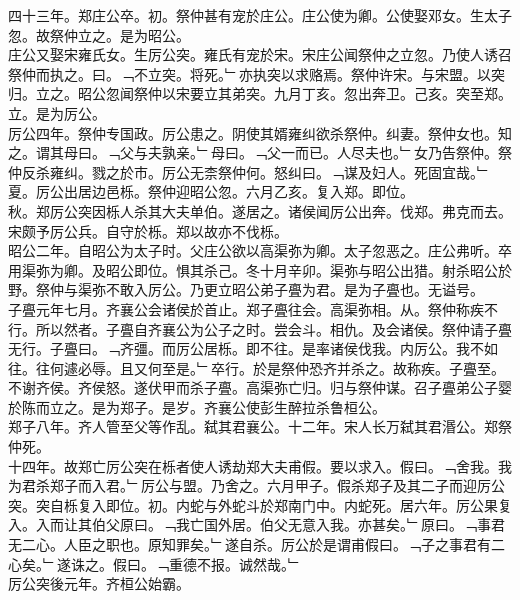 \documentclass{zhvt-classic}
\begin{document}
\hspace*{2em}四十三年。郑庄公卒。初。祭仲甚有宠於庄公。庄公使为卿。公使娶邓女。生太子忽。故祭仲立之。是为昭公。\\
\hspace*{2em}庄公又娶宋雍氏女。生厉公突。雍氏有宠於宋。宋庄公闻祭仲之立忽。乃使人诱召祭仲而执之。曰。﹁不立突。将死。﹂亦执突以求赂焉。祭仲许宋。与宋盟。以突归。立之。昭公忽闻祭仲以宋要立其弟突。九月丁亥。忽出奔卫。己亥。突至郑。立。是为厉公。\\
\hspace*{2em}厉公四年。祭仲专国政。厉公患之。阴使其婿雍纠欲杀祭仲。纠妻。祭仲女也。知之。谓其母曰。﹁父与夫孰亲。﹂母曰。﹁父一而已。人尽夫也。﹂女乃告祭仲。祭仲反杀雍纠。戮之於市。厉公无柰祭仲何。怒纠曰。﹁谋及妇人。死固宜哉。﹂夏。厉公出居边邑栎。祭仲迎昭公忽。六月乙亥。复入郑。即位。\\
\hspace*{2em}秋。郑厉公突因栎人杀其大夫单伯。遂居之。诸侯闻厉公出奔。伐郑。弗克而去。宋颇予厉公兵。自守於栎。郑以故亦不伐栎。\\
\hspace*{2em}昭公二年。自昭公为太子时。父庄公欲以高渠弥为卿。太子忽恶之。庄公弗听。卒用渠弥为卿。及昭公即位。惧其杀己。冬十月辛卯。渠弥与昭公出猎。射杀昭公於野。祭仲与渠弥不敢入厉公。乃更立昭公弟子亹为君。是为子亹也。无谥号。\\
\hspace*{2em}子亹元年七月。齐襄公会诸侯於首止。郑子亹往会。高渠弥相。从。祭仲称疾不行。所以然者。子亹自齐襄公为公子之时。尝会斗。相仇。及会诸侯。祭仲请子亹无行。子亹曰。﹁齐彊。而厉公居栎。即不往。是率诸侯伐我。内厉公。我不如往。往何遽必辱。且又何至是。﹂卒行。於是祭仲恐齐并杀之。故称疾。子亹至。不谢齐侯。齐侯怒。遂伏甲而杀子亹。高渠弥亡归。归与祭仲谋。召子亹弟公子婴於陈而立之。是为郑子。是岁。齐襄公使彭生醉拉杀鲁桓公。\\
\hspace*{2em}郑子八年。齐人管至父等作乱。弑其君襄公。十二年。宋人长万弑其君湣公。郑祭仲死。\\
\hspace*{2em}十四年。故郑亡厉公突在栎者使人诱劫郑大夫甫假。要以求入。假曰。﹁舍我。我为君杀郑子而入君。﹂厉公与盟。乃舍之。六月甲子。假杀郑子及其二子而迎厉公突。突自栎复入即位。初。内蛇与外蛇斗於郑南门中。内蛇死。居六年。厉公果复入。入而让其伯父原曰。﹁我亡国外居。伯父无意入我。亦甚矣。﹂原曰。﹁事君无二心。人臣之职也。原知罪矣。﹂遂自杀。厉公於是谓甫假曰。﹁子之事君有二心矣。﹂遂诛之。假曰。﹁重德不报。诚然哉。﹂\\
\hspace*{2em}厉公突後元年。齐桓公始霸。\\
\end{document}
